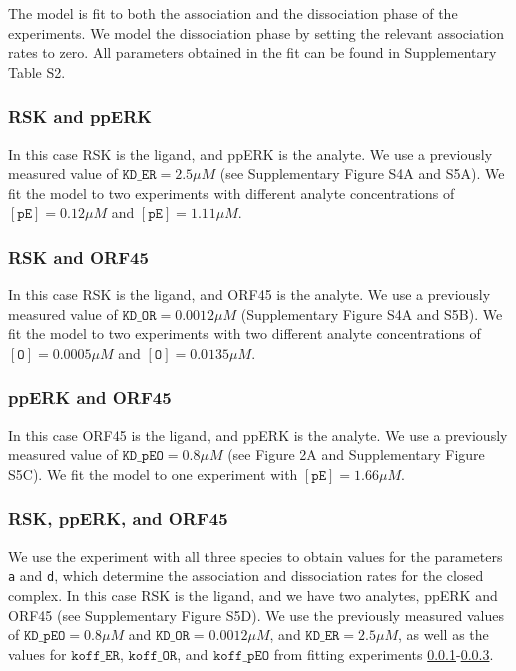 \documentclass[12pt]{article}
\begin{document}
	The model is fit to both the association and the dissociation phase
	of the experiments. We model the dissociation phase by setting the
	relevant association rates to zero. All parameters obtained in the fit can be found in Supplementary Table S2.
	
	\subsubsection{RSK and ppERK}
	\label{sss:er} In this case RSK is the ligand, and ppERK is the analyte.
	We use a previously measured value of $\texttt{KD\_ER}=2.5\mu M$ (see Supplementary Figure S4A and S5A). We fit the model to two experiments with different analyte concentrations of $[\texttt{pE}]=0.12\mu M$ and
	$[\texttt{pE}]=1.11\mu M$.
	
	
	\subsubsection{RSK and ORF45}
	In this case RSK is the ligand, and ORF45 is the analyte. We use a
	previously measured value of $\texttt{KD\_OR}=0.0012\mu M$ (Supplementary Figure S4A and S5B). We fit the model to two experiments with two different analyte concentrations of $[\texttt{O}]=0.0005\mu M$ and $[\texttt{O}]=0.0135\mu M$.
	
	
	\subsubsection{ppERK and ORF45}
	
	\label{sss:eo} In this case ORF45 is the ligand, and ppERK is the
	analyte. We use a previously measured value of $\texttt{KD\_pEO}=0.8\mu M$
	(see Figure 2A and Supplementary Figure S5C). We fit the model to one experiment with $[\texttt{pE}]=1.66\mu M$.
	
	
	\subsubsection{RSK, ppERK, and ORF45}
	
	We use the experiment with all three species to obtain values for
	the parameters \texttt{a} and \texttt{d}, which determine the association
	and dissociation rates for the closed complex. In this case RSK is
	the ligand, and we have two analytes, ppERK and ORF45 (see Supplementary Figure S5D). We use the previously measured values of $\texttt{KD\_pEO}=0.8\mu M$ and $\texttt{KD\_OR}=0.0012\mu M$, and $\texttt{KD\_ER}=2.5\mu M$, as well as the values for $\texttt{koff\_ER}$, $\texttt{koff\_OR}$, and $\texttt{koff\_pEO}$ from fitting experiments \ref{sss:er}-\ref{sss:eo}.
	
\end{document}
